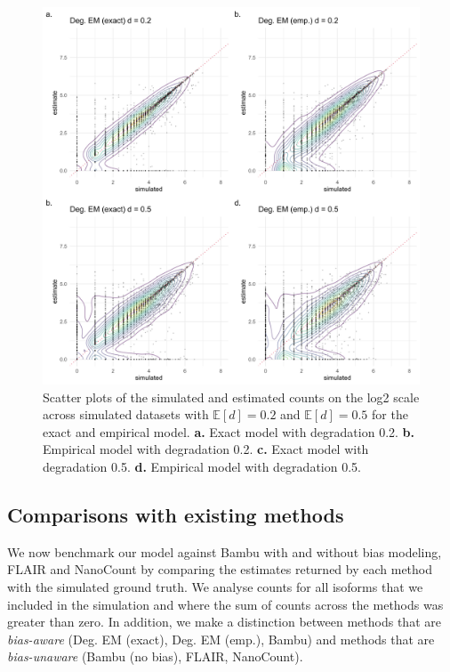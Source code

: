 \begin{figure}[H]
    \centering
    \includegraphics[width=\textwidth]{figures/sec-4-1-scatter-hard.png}
    \caption[Scatter plots across simulated datasets for model variations]{Scatter plots of the simulated and estimated counts on the log2 scale across simulated datasets with $\mathbb{E}[d]=0.2$ and $\mathbb{E}[d]=0.5$ for the exact and empirical model. \textbf{a.} Exact model with degradation 0.2. \textbf{b.} Empirical model with degradation 0.2. \textbf{c.} Exact model with degradation 0.5. \textbf{d.} Empirical model with degradation 0.5.}
    \label{fig:4-1-scatter}
\end{figure}

\subsection{Comparisons with existing methods}

We now benchmark our model against Bambu with and without bias modeling, FLAIR and NanoCount by comparing the estimates returned by each method with the simulated ground truth. We analyse counts for all isoforms that we included in the simulation and where the sum of counts across the methods was greater than zero. In addition, we make a distinction between methods that are \textit{bias-aware} (Deg. EM (exact), Deg. EM (emp.), Bambu) and methods that are \textit{bias-unaware} (Bambu (no bias), FLAIR, NanoCount). 

